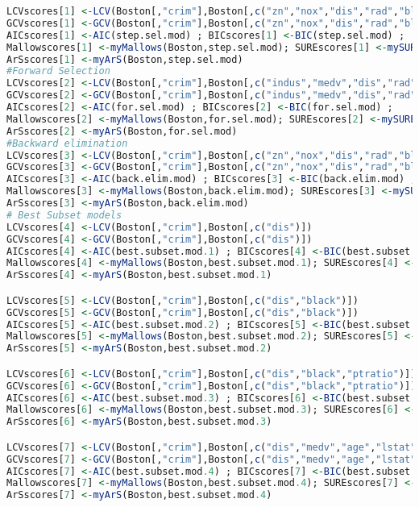 \documentclass[11pt]{report}
\begin{document}
\begin{itemize}
\begin{lstlisting}[language=R]
LCVscores[1] <-LCV(Boston[,"crim"],Boston[,c("zn","nox","dis","rad","black","medv")]) ;
GCVscores[1] <-GCV(Boston[,"crim"],Boston[,c("zn","nox","dis","rad","black","medv")]) ;
AICscores[1] <-AIC(step.sel.mod) ; BICscores[1] <-BIC(step.sel.mod) ; 
Mallowscores[1] <-myMallows(Boston,step.sel.mod); SUREscores[1] <-mySURE(step.sel.mod)
ArSscores[1] <-myArS(Boston,step.sel.mod)
#Forward Selection
LCVscores[2] <-LCV(Boston[,"crim"],Boston[,c("indus","medv","dis","rad","zn","black")])
GCVscores[2] <-GCV(Boston[,"crim"],Boston[,c("indus","medv","dis","rad","zn","black")])
AICscores[2] <-AIC(for.sel.mod) ; BICscores[2] <-BIC(for.sel.mod) ; 
Mallowscores[2] <-myMallows(Boston,for.sel.mod); SUREscores[2] <-mySURE(for.sel.mod)
ArSscores[2] <-myArS(Boston,for.sel.mod)
#Backward elimination
LCVscores[3] <-LCV(Boston[,"crim"],Boston[,c("zn","nox","dis","rad","black","medv")])
GCVscores[3] <-GCV(Boston[,"crim"],Boston[,c("zn","nox","dis","rad","black","medv")])
AICscores[3] <-AIC(back.elim.mod) ; BICscores[3] <-BIC(back.elim.mod) ; 
Mallowscores[3] <-myMallows(Boston,back.elim.mod); SUREscores[3] <-mySURE(back.elim.mod)
ArSscores[3] <-myArS(Boston,back.elim.mod)
# Best Subset models
LCVscores[4] <-LCV(Boston[,"crim"],Boston[,c("dis")])
GCVscores[4] <-GCV(Boston[,"crim"],Boston[,c("dis")])
AICscores[4] <-AIC(best.subset.mod.1) ; BICscores[4] <-BIC(best.subset.mod.1) ; 
Mallowscores[4] <-myMallows(Boston,best.subset.mod.1); SUREscores[4] <-mySURE(best.subset.mod.1)
ArSscores[4] <-myArS(Boston,best.subset.mod.1)

LCVscores[5] <-LCV(Boston[,"crim"],Boston[,c("dis","black")])
GCVscores[5] <-GCV(Boston[,"crim"],Boston[,c("dis","black")])
AICscores[5] <-AIC(best.subset.mod.2) ; BICscores[5] <-BIC(best.subset.mod.2) ; 
Mallowscores[5] <-myMallows(Boston,best.subset.mod.2); SUREscores[5] <-mySURE(best.subset.mod.2)
ArSscores[5] <-myArS(Boston,best.subset.mod.2)

LCVscores[6] <-LCV(Boston[,"crim"],Boston[,c("dis","black","ptratio")])
GCVscores[6] <-GCV(Boston[,"crim"],Boston[,c("dis","black","ptratio")])
AICscores[6] <-AIC(best.subset.mod.3) ; BICscores[6] <-BIC(best.subset.mod.3) ; 
Mallowscores[6] <-myMallows(Boston,best.subset.mod.3); SUREscores[6] <-mySURE(best.subset.mod.3)
ArSscores[6] <-myArS(Boston,best.subset.mod.3)

LCVscores[7] <-LCV(Boston[,"crim"],Boston[,c("dis","medv","age","lstat")])
GCVscores[7] <-GCV(Boston[,"crim"],Boston[,c("dis","medv","age","lstat")])
AICscores[7] <-AIC(best.subset.mod.4) ; BICscores[7] <-BIC(best.subset.mod.4) ; 
Mallowscores[7] <-myMallows(Boston,best.subset.mod.4); SUREscores[7] <-mySURE(best.subset.mod.4)
ArSscores[7] <-myArS(Boston,best.subset.mod.4)


\end{lstlisting}
\end{itemize}
\end{document}
